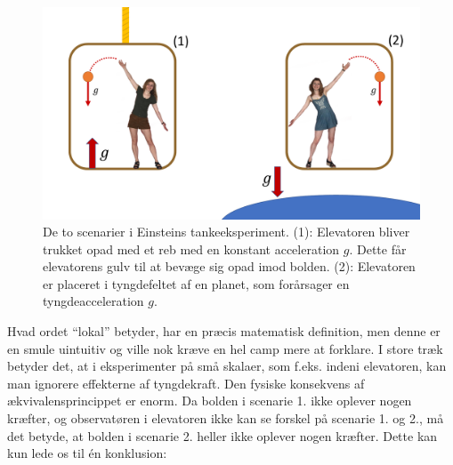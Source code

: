 \documentclass[crop=false, class=memoir]{standalone}
\begin{document}
%
\begin{center}
\end{center}
%
\begin{figure}[]
    \centering
    \includegraphics[width = \textwidth]{Rel/Billeder/Equiv.pdf}
    \caption{De to scenarier i Einsteins tankeeksperiment. (1): Elevatoren bliver trukket opad med et reb med en konstant acceleration $g$. Dette får elevatorens gulv til at bevæge sig opad imod bolden. (2): Elevatoren er placeret i tyngdefeltet af en planet, som forårsager en tyngdeacceleration $g$.}
    \label{rel:fig:equiv}
\end{figure}
%
Hvad ordet ``lokal'' betyder, har en præcis matematisk definition, men denne er en smule uintuitiv og ville nok kræve en hel camp mere at forklare. I store træk betyder det, at i eksperimenter på små skalaer, som f.eks. indeni elevatoren, kan man ignorere effekterne af tyngdekraft. Den fysiske konsekvens af ækvivalensprincippet er enorm. Da bolden i scenarie 1. ikke oplever nogen kræfter, og observatøren i elevatoren ikke kan se forskel på scenarie 1. og 2., må det betyde, at bolden i scenarie 2. heller ikke oplever nogen kræfter. Dette kan kun lede os til én konklusion:
%
\begin{center}
\end{center}
%
\end{document}
